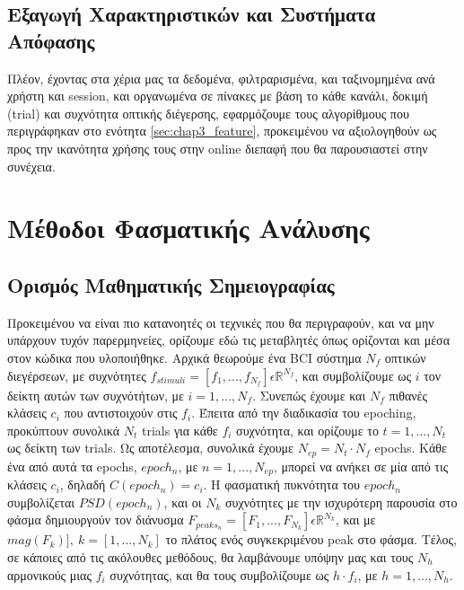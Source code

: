\documentclass[11pt,a4paper,english,greek,twoside]{../Thesis}
\begin{document}
\subsection{Εξαγωγή Χαρακτηριστικών και Συστήματα Απόφασης}
\label{subsec:featureExtract}
\par Πλέον, έχοντας στα χέρια μας τα δεδομένα, φιλτραρισμένα, και ταξινομημένα ανά χρήστη και session, και οργανωμένα σε πίνακες με βάση το κάθε κανάλι, δοκιμή (trial) και συχνότητα οπτικής διέγερσης, εφαρμόζουμε τους αλγορίθμους που περιγράφηκαν στο ενότητα \ref{sec:chap3_feature}, προκειμένου να αξιολογηθούν ως προς την ικανότητα χρήσης τους στην online διεπαφή που θα παρουσιαστεί στην συνέχεια.

\section{Μέθοδοι Φασματικής Ανάλυσης}
\subsection{Ορισμός Μαθηματικής Σημειογραφίας}
\par Προκειμένου να είναι πιο κατανοητές οι τεχνικές που θα περιγραφούν, και να μην υπάρχουν τυχόν παρερμηνείες, ορίζουμε εδώ τις μεταβλητές όπως ορίζονται και μέσα στον κώδικα που υλοποιήθηκε. Αρχικά θεωρούμε ένα BCI σύστημα $N_f$ οπτικών διεγέρσεων, με συχνότητες $f_{stimuli} = [f_1,...,f_{N_f}] \epsilon \mathbb{R}^{N_f}$, και συμβολίζουμε ως $i$ τον δείκτη αυτών των συχνότήτων, με $i = 1,...,N_f$. Συνεπώς έχουμε και $N_f$ πιθανές κλάσεις $c_i$ που αντιστοιχούν στις $f_i$. Έπειτα από την διαδικασία του epoching, προκύπτουν συνολικά $N_t$ trials για κάθε $f_i$ συχνότητα, και ορίζουμε το $t = 1,...,N_t$ ως δείκτη των trials. Ως αποτέλεσμα, συνολικά έχουμε $N_{ep} = N_t\cdot N_f$ epochs. Κάθε ένα από αυτά τα epochs, $epoch_n$, με $n=1,...,N_{ep}$, μπορεί να ανήκει σε μία από τις κλάσεις $c_i$, δηλαδή $C(epoch_n) = c_i$. Η φασματική πυκνότητα του $epoch_n$ συμβολίζεται $PSD(epoch_n)$, και οι $Ν_k$ συχνότητες με την ισχυρότερη παρουσία στο φάσμα δημιουργούν τον διάνυσμα $F_{peaks_{n}} = [F_1,...,F_{N_k}] \epsilon \mathbb{R}^{N_k}$, και με $mag(F_k)], \  k = [1,...,N_k]$ το πλάτος ενός συγκεκριμένου peak στο φάσμα. Τέλος, σε κάποιες από τις ακόλουθες μεθόδους, θα λαμβάνουμε υπόψην μας και τους $N_h$ αρμονικούς μιας $f_i$ συχνότητας, και θα τους συμβολίζουμε ως $h\cdot f_i$, με $h=1,...,N_h$.
\end{document}

